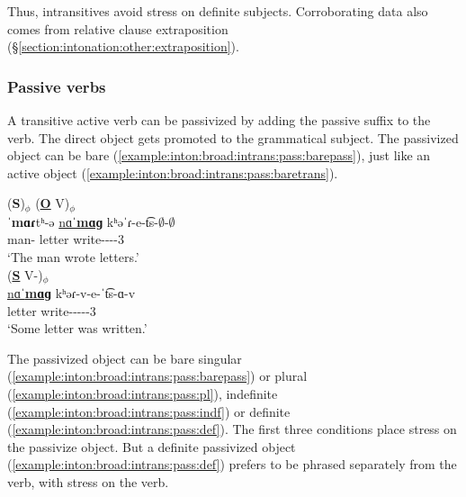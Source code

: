 Thus, intransitives   avoid stress on definite subjects. Corroborating data also comes from relative clause extraposition (\S\ref{section:intonation:other:extraposition}). 

\subsubsection{Passive verbs}\label{section:intonation:broadFocus:intrans:pass}

A transitive active verb can be passivized by adding the passive suffix to the verb. The direct object gets promoted to the grammatical subject. The passivized object can be bare (\ref{example:inton:broad:intrans:pass:barepass}), just like an active object (\ref{example:inton:broad:intrans:pass:baretrans}). 


\begin{exe}
	\ex \begin{xlist}
		\ex \glll (\textbf{S})$_\phi$ (\textbf{\underline{O}} V)$_\phi$ \\
		ˈ\textbf{mɑɾ}tʰ-ə \underline{nɑˈ\textbf{mɑɡ}} kʰəˈɾ-e-t͡s-$\emptyset$-$\emptyset$ \\
		man-{} letter write-{\thgloss}-{\aorperf}-{\pst}-3{\sg} \\
		\trans `The man wrote letters.' \label{example:inton:broad:intrans:pass:baretrans}
		\\ 
		\ex \glll  (\textbf{\underline{S}} V-{\pass})$_\phi$ \\
		\underline{nɑˈ\textbf{mɑɡ}} kʰəɾ-v-e-ˈ{t͡s-ɑ-v} \\
		letter write-{\pass}-{\thgloss}-{\aorperf}-{\pst}-3{\sg} \\
		\trans `Some letter was written.' \label{example:inton:broad:intrans:pass:barepass}
		\\ 
	\end{xlist}
\end{exe}

The passivized object can be bare singular (\ref{example:inton:broad:intrans:pass:barepass}) or   plural (\ref{example:inton:broad:intrans:pass:pl}), indefinite  (\ref{example:inton:broad:intrans:pass:indf}) or definite (\ref{example:inton:broad:intrans:pass:def}). The first three conditions place stress on the passivize object. But a definite passivized object  (\ref{example:inton:broad:intrans:pass:def}) prefers to be phrased separately from the verb, with stress on the verb. 

